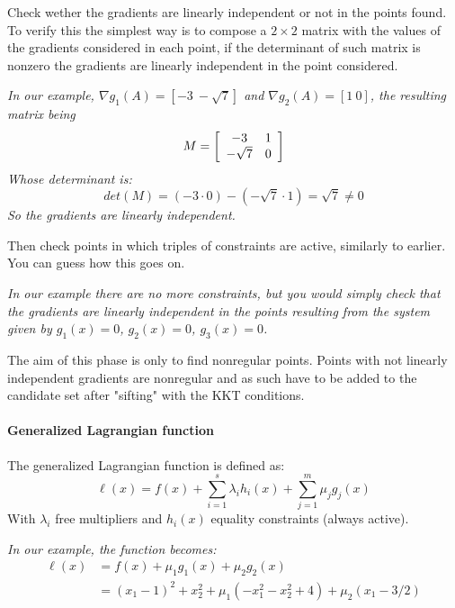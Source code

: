 Check wether the gradients are linearly independent or not in the points found. To verify this the simplest way is to compose a $2 \times 2$ matrix with the values of the gradients considered in each point, if the determinant of such matrix is nonzero the gradients are linearly independent in the point considered.

\textit{In our example, $\nabla g_1 (A) = \left[- 3 \ -\sqrt{7}\right]$ and $\nabla g_2 (A) = \left[1 \ 0 \right]$, the resulting matrix being
$$
M = \left[\begin{array}{c c}
	-3 & 1 \\ -\sqrt{7} & 0
\end{array} \right]
$$
Whose determinant is: 
$$ det(M) = (-3 \cdot 0) - (-\sqrt{7} \cdot 1) = \sqrt{7} \neq 0$$
So the gradients are linearly independent.}

Then check points in which triples of constraints are active, similarly to earlier. You can guess how this goes on.

\textit{In our example there are no more constraints, but you would simply check that the gradients are linearly independent in the points resulting from the system given by $g_1(x) = 0$, $g_2(x) = 0$, $g_3(x) = 0$.}

The aim of this phase is only to find nonregular points. Points with not linearly independent gradients are nonregular and as such have to be added to the candidate set after "sifting" with the KKT conditions.

\paragraph{Generalized Lagrangian function} The generalized Lagrangian function is defined as:
$$ \ell (x) = f(x) + \sum_{i = 1}^s \lambda_i h_i (x) + \sum_{j = 1}^m \mu_j g_j (x) $$
With $\lambda_i$ free multipliers and $h_i (x)$ equality constraints (always active).

\textit{In our example, the function becomes:
\begin{align*}
	\ell (x) & = f(x) + \mu_1 g_1 (x) + \mu_2 g_2 (x) \\
	& = (x_1 - 1)^2 + x_2^2 + \mu_1\left(-x_1^2 - x_2^2 + 4\right) + \mu_2 (x_1 - 3/2)
\end{align*}
}

